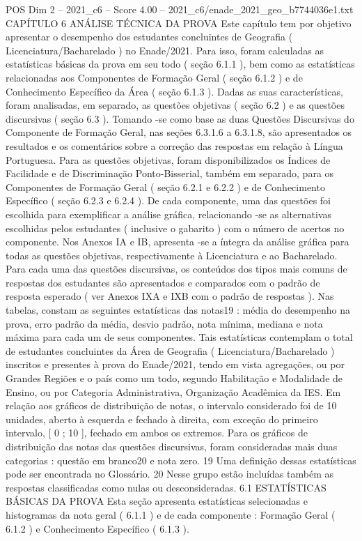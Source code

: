 \begin{textsample}{POS Dim 2 – 2021\_c6 – Score 4.00 – 2021\_c6/enade\_2021\_geo\_b7744036e1.txt}  \label{ex:f2_pos_175}
CAPÍTULO 6 ANÁLISE TÉCNICA DA PROVA Este capítulo tem por objetivo apresentar o desempenho dos estudantes concluintes de Geografia ( Licenciatura/Bacharelado ) no Enade/2021.
Para isso, foram calculadas as estatísticas básicas da prova em seu todo ( seção 6.1.1 ), bem como as estatísticas relacionadas aos Componentes de Formação Geral ( seção 6.1.2 ) e de Conhecimento Específico da Área ( seção 6.1.3 ).
Dadas as suas características, foram analisadas, em separado, as questões objetivas ( seção 6.2 ) e as questões discursivas ( seção 6.3 ).
Tomando -se como base as duas Questões Discursivas do Componente de Formação Geral, nas seções 6.3.1.6 a 6.3.1.8, são apresentados os resultados e os comentários sobre a correção das respostas em relação à Língua Portuguesa.
Para as questões objetivas, foram disponibilizados os Índices de Facilidade e de Discriminação Ponto-Bisserial, também em separado, para os Componentes de Formação Geral ( seção 6.2.1 e 6.2.2 ) e de Conhecimento Específico ( seção 6.2.3 e 6.2.4 ).
De cada componente, uma das questões foi escolhida para exemplificar a análise gráfica, relacionando -se as alternativas escolhidas pelos estudantes ( inclusive o gabarito ) com o número de acertos no componente.
Nos Anexos IA e IB, apresenta -se a íntegra da análise gráfica para todas as questões objetivas, respectivamente à Licenciatura e ao Bacharelado.
Para cada uma das questões discursivas, os conteúdos dos tipos mais comuns de respostas dos estudantes são apresentados e comparados com o padrão de resposta esperado ( ver Anexos IXA e IXB com o padrão de respostas ).
Nas tabelas, constam as seguintes estatísticas das notas19 : média do desempenho na prova, erro padrão da média, desvio padrão, nota mínima, mediana e nota máxima para cada um de seus componentes.
Tais estatísticas contemplam o total de estudantes concluintes da Área de Geografia ( Licenciatura/Bacharelado ) inscritos e presentes à prova do Enade/2021, tendo em vista agregações, ou por Grandes Regiões e o país como um todo, segundo Habilitação e Modalidade de Ensino, ou por Categoria Administrativa, Organização Acadêmica da IES.
Em relação aos gráficos de distribuição de notas, o intervalo considerado foi de 10 unidades, aberto à esquerda e fechado à direita, com exceção do primeiro intervalo, [ 0 ; 10 ], fechado em ambos os extremos.
Para os gráficos de distribuição das notas das questões discursivas, foram consideradas mais duas categorias : questão em branco20 e nota zero. 19 Uma definição dessas estatísticas pode ser encontrada no Glossário. 20 Nesse grupo estão incluídas também as respostas classificadas como nulas ou desconsideradas. 6.1 ESTATÍSTICAS BÁSICAS DA PROVA Esta seção apresenta estatísticas selecionadas e histogramas da nota geral ( 6.1.1 ) e de cada componente : Formação Geral ( 6.1.2 ) e Conhecimento Específico ( 6.1.3 ).

\end{textsample}
